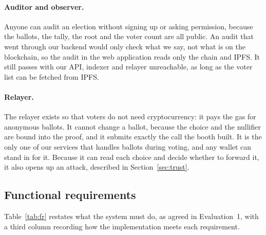 \paragraph{Auditor and observer.}
Anyone can audit an election without signing up or asking permission, because
the ballots, the tally, the root and the voter count are all public. An audit
that went through our backend would only check what we say, not what is on the
blockchain, so the audit in the web application reads only the chain and
IPFS. It still passes with our API, indexer and relayer unreachable, as long
as the voter list can be fetched from IPFS.

\paragraph{Relayer.}
The relayer exists so that voters do not need cryptocurrency: it pays the gas
for anonymous ballots. It cannot change a ballot, because the choice and the
nullifier are bound into the proof, and it submits exactly the call the booth
built. It is the only one of our services that handles ballots during voting,
and any wallet can stand in for it. Because it can read each choice and decide whether to forward it, it also
opens up an attack, described in Section~\ref{sec:trust}.

\subsection{Functional requirements}

Table~\ref{tab:fr} restates what the system must do, as agreed in
Evaluation~1, with a third column recording how the implementation meets each
requirement.

